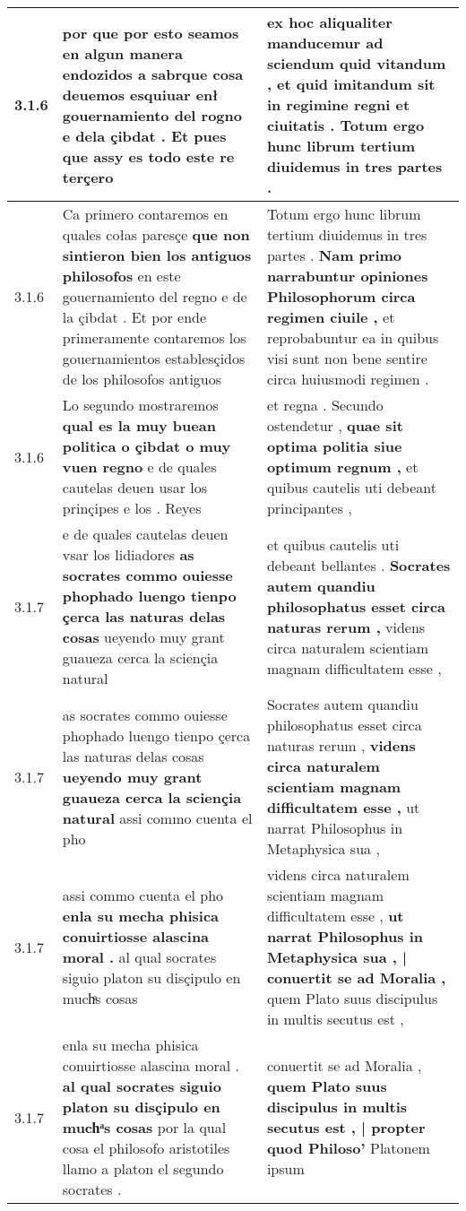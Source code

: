 \begin{tabular}{|p{1cm}|p{6.5cm}|p{6.5cm}|}
3.1.6 & por que por esto seamos en algun manera endozidos \textbf{ a sabrque cosa deuemos esquiuar enł gouernamiento del rogno e dela çibdat . } Et pues que assy es todo este re terçero & ex hoc aliqualiter manducemur ad sciendum \textbf{ quid vitandum , et quid imitandum sit in regimine regni et ciuitatis . } Totum ergo hunc librum tertium diuidemus in tres partes . \\\hline
3.1.6 & Ca primero contaremos en quales cołas paresçe \textbf{ que non sintieron bien los antiguos philosofos } en este gouernamiento del regno e de la çibdat . Et por ende primeramente contaremos los gouernamientos establesçidos de los philosofos antiguos & Totum ergo hunc librum tertium diuidemus in tres partes . \textbf{ Nam primo narrabuntur opiniones Philosophorum circa regimen ciuile , } et reprobabuntur ea in quibus visi sunt non bene sentire circa huiusmodi regimen . \\\hline
3.1.6 & Lo segundo mostraremos \textbf{ qual es la muy buean politica o çibdat o muy vuen regno } e de quales cautelas deuen usar los prinçipes e los . Reyes & et regna . Secundo ostendetur , \textbf{ quae sit optima politia siue optimum regnum , } et quibus cautelis uti debeant principantes , \\\hline
3.1.7 & e de quales cautelas deuen vsar los lidiadores \textbf{ as socrates commo ouiesse phophado luengo tienpo çerca las naturas delas cosas } ueyendo muy grant guaueza cerca la sciençia natural & et quibus cautelis uti debeant bellantes . \textbf{ Socrates autem quandiu philosophatus esset circa naturas rerum , } videns circa naturalem scientiam magnam difficultatem esse , \\\hline
3.1.7 & as socrates commo ouiesse phophado luengo tienpo çerca las naturas delas cosas \textbf{ ueyendo muy grant guaueza cerca la sciençia natural } assi commo cuenta el pho & Socrates autem quandiu philosophatus esset circa naturas rerum , \textbf{ videns circa naturalem scientiam magnam difficultatem esse , } ut narrat Philosophus in Metaphysica sua , \\\hline
3.1.7 & assi commo cuenta el pho \textbf{ enla su mecha phisica conuirtiosse alascina moral . } al qual socrates siguio platon su disçipulo en muchͣs cosas & videns circa naturalem scientiam magnam difficultatem esse , \textbf{ ut narrat Philosophus in Metaphysica sua , | conuertit se ad Moralia , } quem Plato suus discipulus in multis secutus est , \\\hline
3.1.7 & enla su mecha phisica conuirtiosse alascina moral . \textbf{ al qual socrates siguio platon su disçipulo en muchͣs cosas } por la qual cosa el philosofo aristotiles llamo a platon el segundo socrates . & conuertit se ad Moralia , \textbf{ quem Plato suus discipulus in multis secutus est , | propter quod Philoso’ } Platonem ipsum \\\hline

\end{tabular}
